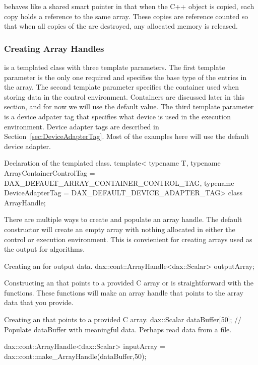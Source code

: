  behaves like a shared smart pointer in that when the
C++ object is copied, each copy holds a reference to the same array. These
copies are reference counted so that when all copies of the
 are destroyed, any allocated memory is released.

\subsubsection{Creating Array Handles}

 is a templated class with three template
parameters. The first template parameter is the only one required and
specifies the base type of the entries in the array. The second template
parameter specifies the container used when storing data in the control
environment. Containers are discussed later in this section, and for now we
will use the default value. The third template parameter is a device
adpater tag that specifies what device is used in the execution
environment. Device adapter tags are described in
Section~\ref{sec:DeviceAdapterTag}. Most of the examples here will use the
default device adapter.

\begin{daxexample}{Declaration of the \protect{} templated class.}
template<
    typename T,
    typename ArrayContainerControlTag = DAX_DEFAULT_ARRAY_CONTAINER_CONTROL_TAG,
    typename DeviceAdapterTag = DAX_DEFAULT_DEVICE_ADAPTER_TAG>
class ArrayHandle;
\end{daxexample}

There are multiple ways to create and populate an array handle. The default
 constructor will create an empty array with nothing
allocated in either the control or execution environment. This is
convienient for creating arrays used as the output for algorithms.

\begin{daxexample}{Creating an  for output data.}
dax::cont::ArrayHandle<dax::Scalar> outputArray;
\end{daxexample}

Constructing an  that points to a provided C array or
 is straightforward with the
 functions. These functions will make an array
handle that points to the array data that you provide.

\begin{daxexample}{Creating an  that points to a provided C array.}
dax::Scalar dataBuffer[50];
// Populate dataBuffer with meaningful data. Perhaps read data from a file.

dax::cont::ArrayHandle<dax::Scalar> inputArray = dax::cont::make_ArrayHandle(dataBuffer,50);
\end{daxexample}

